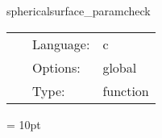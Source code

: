 
\hspace{5mm} sphericalsurface\_paramcheck 

\hspace{5mm}{\it check that all surface names are unique } 


\hspace{5mm}

 \begin{tabular*}{160mm}{cll} 
~ & Language:  & c \\ 
~ & Options:  & global \\ 
~ & Type:  & function \\ 
\end{tabular*} 



\vspace{5mm}\parskip = 10pt 


